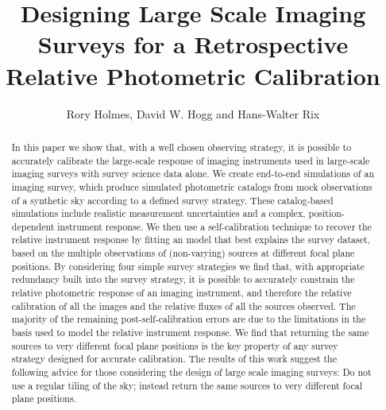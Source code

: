 \documentclass[manuscript]{aastex}
\begin{document}

\title{Designing Large Scale Imaging Surveys for a Retrospective Relative Photometric Calibration}


\author{Rory Holmes, David W. Hogg and Hans-Walter Rix}


\begin{abstract}
In this paper we show that, with a well chosen observing strategy, it is possible to accurately calibrate the large-scale response of imaging instruments used in large-scale imaging surveys with survey science data alone. We create end-to-end simulations of an imaging survey, which produce simulated photometric catalogs from mock observations of a synthetic sky according to a defined survey strategy. These catalog-based simulations include realistic measurement uncertainties and a complex, position-dependent instrument response. We then use a self-calibration technique to recover the relative instrument response by fitting an model that best explains the survey dataset, based on the multiple observations of (non-varying) sources at different focal plane positions. By considering four simple survey strategies we find that, with appropriate redundancy built into the survey strategy, it is possible to accurately constrain the relative photometric response of an imaging instrument, and therefore the relative calibration of all the images and the relative fluxes of all the sources observed. The majority of the remaining post-self-calibration errors are due to the limitations in the basis used to model the relative instrument response. We find that returning the same sources to very different focal plane positions is the key property of any survey strategy designed for accurate calibration. The results of this work suggest the following advice for those considering the design of large scale imaging surveys: Do not use a regular tiling of the sky; instead return the same sources to very different focal plane positions.
\end{abstract}
\end{document}
